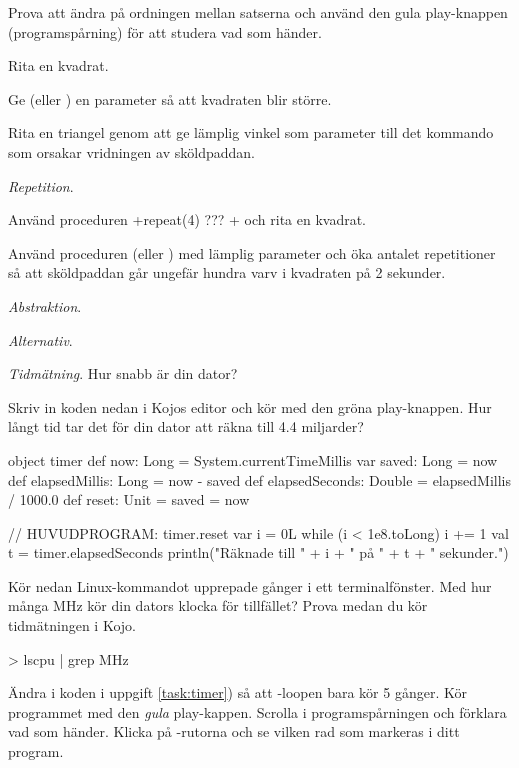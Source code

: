 \Subtask Prova att ändra på ordningen mellan satserna och använd den gula play-knappen  (programspårning) för att studera vad som händer.

\Subtask Rita en kvadrat.

\Subtask Ge  (eller ) en parameter så att kvadraten blir större.

\Subtask Rita en triangel genom att ge lämplig vinkel som parameter till det kommando som orsakar vridningen av sköldpaddan.

\Task \textit{Repetition}. 

\Subtask Använd proceduren \code+repeat(4){ ??? }+ och rita en kvadrat.

\Subtask Använd proceduren  (eller ) med lämplig parameter och öka antalet repetitioner så att sköldpaddan går ungefär hundra varv i kvadraten på 2 sekunder.

\Task \textit{Abstraktion}. 

\Task \textit{Alternativ}.

\Task \textit{Tidmätning}. Hur snabb är din dator?

\Subtask \label{task:timer} Skriv in koden nedan i Kojos editor och kör med den gröna play-knappen. Hur långt tid tar det för din dator att räkna till 4.4 miljarder?

\begin{Code}
object timer {
  def now: Long = System.currentTimeMillis
  var saved: Long = now
  def elapsedMillis: Long = now - saved
  def elapsedSeconds: Double = elapsedMillis / 1000.0
  def reset: Unit = { saved = now }
}

// HUVUDPROGRAM:
timer.reset
var i = 0L
while (i < 1e8.toLong) { i += 1 }
val t = timer.elapsedSeconds
println("Räknade till " + i + " på " + t + " sekunder.")
\end{Code}

\Subtask  Kör nedan Linux-kommandot upprepade gånger i ett terminalfönster. Med hur många MHz kör din dators klocka för tillfället? Prova medan du kör tidmätningen i Kojo.
\begin{REPL}
> lscpu | grep MHz
\end{REPL}

\Subtask Ändra i koden i uppgift \ref{task:timer}) så att -loopen bara kör 5 gånger. Kör programmet med den \emph{gula} play-kappen. Scrolla i programspårningen och förklara vad som händer. Klicka på -rutorna och se vilken rad som markeras i ditt program.

